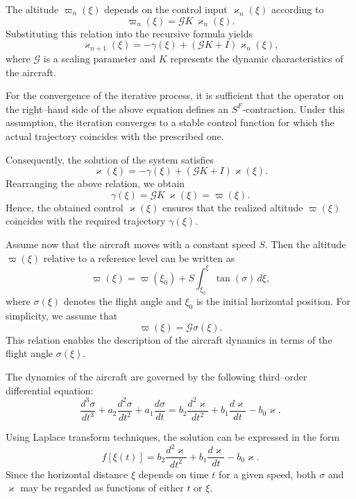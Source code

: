 \documentclass[pdflatex,sn-mathphys-num]{sn-jnl}%
\theoremstyle{thmstyleone}%
\theoremstyle{thmstyletwo}%
\theoremstyle{thmstylethree}%
\begin{document}
The altitude $\varpi_n(\xi)$ depends on the control input $\varkappa_n(\xi)$ according to
\begin{equation}\label{aa1}
\varpi_n(\xi)=\mathcal{G}K\,\varkappa_n(\xi).
\end{equation}
Substituting this relation into the recursive formula yields
\begin{equation}\label{aa2}
\varkappa_{n+1}(\xi)
= -\gamma(\xi)+(\mathcal{G}K+I)\varkappa_n(\xi),
\end{equation}
where $\mathcal{G}$ is a scaling parameter and $K$ represents the dynamic characteristics of the aircraft.

For the convergence of the iterative process, it is sufficient that the operator on the right–hand side of the above equation defines an $S^F$-contraction. Under this assumption, the iteration converges to a stable control function for which the actual trajectory coincides with the prescribed one.

Consequently, the solution of the system satisfies
\[
\varkappa(\xi)= -\gamma(\xi)+(\mathcal{G}K+I)\varkappa(\xi).
\]
Rearranging the above relation, we obtain
\[
\gamma(\xi)=\mathcal{G}K\,\varkappa(\xi)=\varpi(\xi).
\]
Hence, the obtained control $\varkappa(\xi)$ ensures that the realized altitude $\varpi(\xi)$ coincides with the required trajectory $\gamma(\xi)$.

Assume now that the aircraft moves with a constant speed $S$. Then the altitude $\varpi(\xi)$ relative to a reference level can be written as
\[
\varpi(\xi)=\varpi(\xi_0)+S\int_{\xi_0}^{\xi}\tan(\sigma)\,d\xi,
\]
where $\sigma(\xi)$ denotes the flight angle and $\xi_0$ is the initial horizontal position. For simplicity, we assume that
\begin{equation}\label{aa3}
\varpi(\xi)=\mathcal{G}\sigma(\xi).
\end{equation}
This relation enables the description of the aircraft dynamics in terms of the flight angle $\sigma(\xi)$.

The dynamics of the aircraft are governed by the following third–order differential equation:
\begin{equation}\label{aa4}
\frac{d^3\sigma}{dt^3}
+a_2\frac{d^2\sigma}{dt^2}
+a_1\frac{d\sigma}{dt}
=
b_2\frac{d^2\varkappa}{dt^2}
+b_1\frac{d\varkappa}{dt}
-b_0\varkappa.
\end{equation}

Using Laplace transform techniques, the solution can be expressed in the form
\[
f[\xi(t)]
=
b_2\frac{d^2\varkappa}{dt^2}
+
b_1\frac{d\varkappa}{dt}
-
b_0\varkappa.
\]
Since the horizontal distance $\xi$ depends on time $t$ for a given speed, both $\sigma$ and $\varkappa$ may be regarded as functions of either $t$ or $\xi$.
\end{document}
